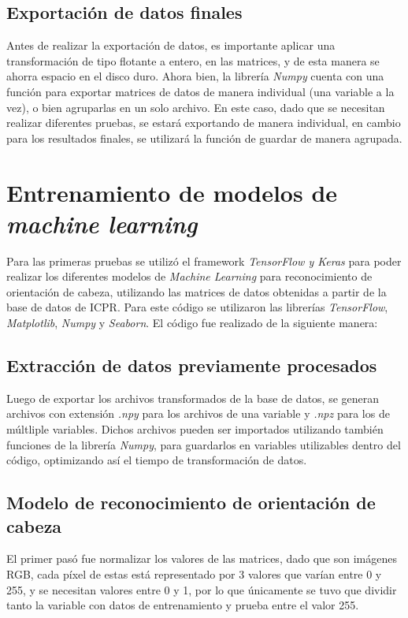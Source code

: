 \subsection{Exportación de datos finales}

Antes de realizar la exportación de datos, es importante aplicar una transformación de tipo flotante a entero, en las matrices, y de esta manera se ahorra espacio en el disco duro. Ahora bien, la librería \textit{Numpy} cuenta con una función para exportar matrices de datos de manera individual (una variable a la vez), o bien agruparlas en un solo archivo. En este caso, dado que se necesitan realizar diferentes pruebas, se estará exportando de manera individual, en cambio para los resultados finales, se utilizará la función de guardar de manera agrupada. 

\section{Entrenamiento de modelos de \textit{machine learning}}
Para las primeras pruebas se utilizó el framework \textit{TensorFlow y Keras} para poder realizar los diferentes modelos de \textit{Machine Learning} para reconocimiento de orientación de cabeza, utilizando las matrices de datos obtenidas a partir de la base de datos de ICPR. Para este código se utilizaron las librerías \textit{TensorFlow}, \textit{Matplotlib}, \textit{Numpy} y \textit{Seaborn}. El código fue realizado de la siguiente manera:

\subsection{Extracción de datos previamente procesados}
Luego de exportar los archivos transformados de la base de datos, se generan archivos con extensión \textit{.npy} para los archivos de una variable y \textit{.npz} para los de múltliple variables. Dichos archivos pueden ser importados utilizando también funciones de la librería \textit{Numpy}, para guardarlos en variables utilizables dentro del código, optimizando así el tiempo de transformación de datos.

\subsection{Modelo de reconocimiento de orientación de cabeza}
El primer pasó fue normalizar los valores de las matrices, dado que son imágenes RGB, cada píxel de estas está representado por 3 valores que varían entre 0 y 255, y se necesitan valores entre 0 y 1, por lo que únicamente se tuvo que dividir tanto la variable con datos de entrenamiento y prueba entre el valor 255. 

